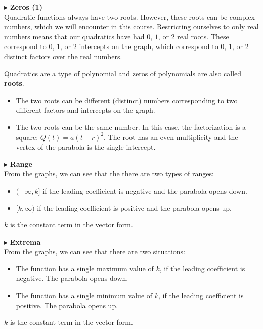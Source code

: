 \documentclass{ximera}
\begin{document}
$\blacktriangleright$ \textbf{\textcolor{red!10!blue!90!}{Zeros (1)}} \\
Quadratic functions always have two roots.  However, these roots can be complex numbers, which we will encounter in this course.  Restricting ourselves to only real numbers means that our quadratics have had $0$, $1$, or $2$ real roots.  These correspond to  $0$, $1$, or $2$ intercepts on the graph, which correspond to $0$, $1$, or $2$ distinct factors over the real numbers. 

Quadratics are a type of polynomial and zeros of polynomials are also called \textbf{roots}.

\begin{itemize}
\item The two roots can be different (distinct) numbers corresponding to two different factors and intercepts on the graph.  
\item The two roots can be the same number.  In this case, the factorization is a square: $Q(t) = a(t-r)^2$.  The root has an even multiplicity and the vertex of the parabola is the single intercept.
\end{itemize}


$\blacktriangleright$ \textbf{\textcolor{red!10!blue!90!}{Range}} \\
From the graphs, we can see that the there are two types of ranges: 
\begin{itemize}
\item $(-\infty, k]$ if the leading coefficient is negative and the parabola opens down.
\item $[k, \infty)$ if the leading coefficient is positive and the parabola opens up.
\end{itemize}

$k$ is the constant term in the vector form.



$\blacktriangleright$  \textbf{\textcolor{red!10!blue!90!}{Extrema}} \\
From the graphs, we can see that there are two situations:
\begin{itemize}
\item The function has a single maximum value of $k$, if the leading coefficient is negative. The parabola opens down.
\item The function has a single minimum value of $k$, if the leading coefficient is positive. The parabola opens up.
\end{itemize}

$k$ is the constant term in the vector form.
\end{document}
